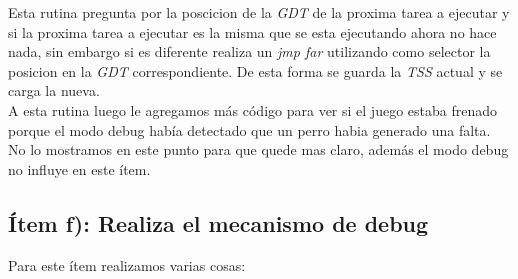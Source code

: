 Esta rutina pregunta por la poscicion de la \textit{GDT}  de la proxima tarea a ejecutar y si la proxima tarea a ejecutar es la misma que se esta ejecutando ahora no hace nada, sin embargo si es diferente realiza un \textit{jmp far} utilizando como selector la posicion en la \textit{GDT} correspondiente. De esta forma se  guarda la \textit{TSS} actual y se carga la nueva. \\

A esta rutina luego le agregamos más código para ver si el juego estaba frenado porque el modo debug había detectado que un perro habia generado una falta. No lo mostramos en este punto para que quede mas claro, además el modo debug no influye en este ítem.

\subsection{Ítem f):  Realiza el mecanismo de debug}

Para este ítem realizamos varias cosas:


